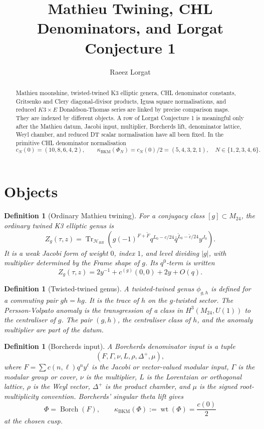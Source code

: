\documentclass[11pt]{article}
\title{Mathieu Twining, CHL Denominators, and Lorgat Conjecture 1}
\author{Raeez Lorgat}
\date{}
\newtheorem{definition}[theorem]{Definition}
\providecommand{\wt}{\operatorname{wt}}
\providecommand{\Tr}{\operatorname{Tr}}
\providecommand{\Borch}{\operatorname{Borch}}
\providecommand{\kBKM}{\kappa_{\mathrm{BKM}}}
\providecommand{\Mtf}{M_{24}}
\providecommand{\Zg}{Z_g}
\begin{document}
\maketitle

\begin{abstract}
Mathieu moonshine, twisted-twined K3 elliptic genera, CHL denominator
constants, Gritsenko and Clery diagonal-divisor products, Igusa square
normalisations, and reduced \(K3\times E\) Donaldson-Thomas series are
linked by precise comparison maps.  They are indexed by different
objects.  A row of Lorgat Conjecture 1 is meaningful only after the
Mathieu datum, Jacobi input, multiplier, Borcherds lift, denominator
lattice, Weyl chamber, and reduced DT scalar normalisation have all
been fixed.  In the primitive CHL denominator normalisation
\[
  c_N(0)=(10,8,6,4,2),\qquad
  \kBKM(\Phi_N)=c_N(0)/2=(5,4,3,2,1),
  \quad N\in\{1,2,3,4,6\}.
\]
\end{abstract}

\tableofcontents

\section{Objects}

\begin{definition}[Ordinary Mathieu twining]
For a conjugacy class \([g]\subset\Mtf\), the ordinary twined K3
elliptic genus is
\[
  \Zg(\tau,z)
  =
  \Tr_{\mathcal H_{RR}}
  \left(g(-1)^{F+\widetilde F}q^{L_0-c/24}
  \bar q^{\widetilde L_0-\widetilde c/24}y^{J_0}\right).
\]
It is a weak Jacobi form of weight \(0\), index \(1\), and level
dividing \(|g|\), with multiplier determined by the Frame shape of
\(g\).  Its \(q^0\)-term is written
\[
  \Zg(\tau,z)=2y^{-1}+c^{(g)}(0,0)+2y+O(q).
\]
\end{definition}

\begin{definition}[Twisted-twined genus]
A twisted-twined genus \(\phi_{g,h}\) is defined for a commuting pair
\(gh=hg\).  It is the trace of \(h\) on the \(g\)-twisted sector.
The Persson-Volpato anomaly is the transgression of a class in
\(H^3(\Mtf,U(1))\) to the centraliser of \(g\).  The pair
\((g,h)\), the centraliser class of \(h\), and the anomaly multiplier
are part of the datum.
\end{definition}

\begin{definition}[Borcherds input]
A Borcherds denominator input is a tuple
\[
  (F,\Gamma,\nu,L,\rho,\Delta^+,\mu),
\]
where \(F=\sum c(n,\ell)q^ny^\ell\) is the Jacobi or vector-valued
modular input, \(\Gamma\) is the modular group or cover, \(\nu\) is
the multiplier, \(L\) is the Lorentzian or orthogonal lattice, \(\rho\)
is the Weyl vector, \(\Delta^+\) is the product chamber, and
\(\mu\) is the signed root-multiplicity convention.  Borcherds'
singular theta lift gives
\[
  \Phi=\Borch(F),\qquad
  \kBKM(\Phi):=\wt(\Phi)=\frac{c(0)}2
\]
at the chosen cusp.
\end{definition}
\end{document}

